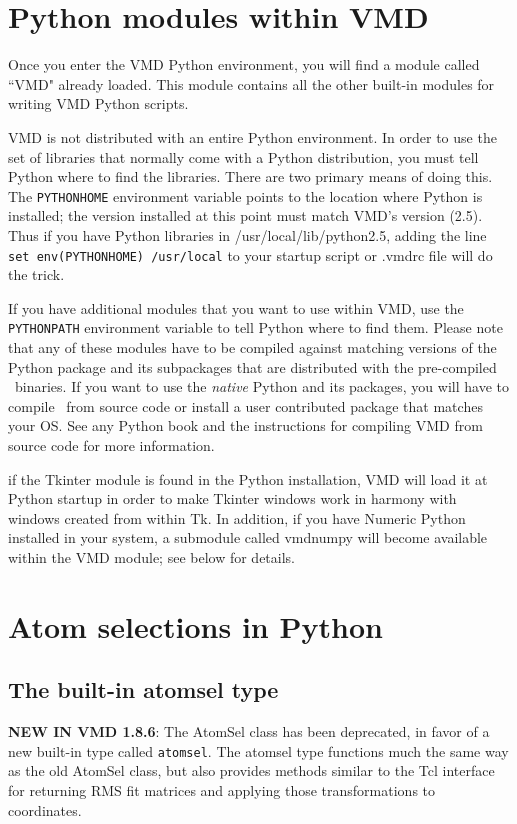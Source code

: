 \section{Python modules within VMD}

Once you enter the VMD Python environment, you will find a module
called ``VMD" already loaded.  This module contains all the other
built-in modules for writing VMD Python scripts.  

VMD is not distributed with an entire Python environment.  In order to 
use the set
of libraries that normally come with a Python distribution, you must
tell Python where to find the libraries.  There are two primary means
of doing this.  The {\tt PYTHONHOME} environment variable points to
the location where Python is installed; the version installed at this
point must match VMD's version (2.5).  Thus if you have Python libraries
in /usr/local/lib/python2.5, adding the line {\tt set env(PYTHONHOME)
/usr/local} to your startup script or .vmdrc file will do the trick.

If you have additional modules that you want to use within VMD, use the
{\tt PYTHONPATH} environment variable to tell Python where to find them.
Please note that any of these modules have to be compiled against matching
versions of the Python package and its subpackages that are distributed
with the pre-compiled \VMD\ binaries. If you want to use the {\sl native}
Python and its packages, you will have to compile \VMD\ from source code
or install a user contributed package that matches your OS.
See any Python book and the instructions for compiling VMD from source
code for more information.

if the Tkinter module is found in the Python installation, VMD will load
it at Python startup in order to make Tkinter windows work in harmony
with windows created from within Tk.  In addition, if you have Numeric
Python installed in your system, a submodule called vmdnumpy will become
available within the VMD module; see below for details.

\section{Atom selections in Python}
\label{ug:ui:text:python:atomselect}

\subsection{The built-in atomsel type}
{\bf NEW IN VMD 1.8.6}: 
The AtomSel class has been deprecated, in favor of a new built-in
type called {\tt atomsel}.  The atomsel type functions much the
same way as the old AtomSel class, but also provides methods similar
to the Tcl interface for returning RMS fit matrices and applying
those transformations to coordinates.  

